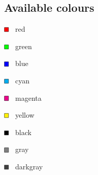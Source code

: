 \documentclass{programmingnotes}
\begin{document}
\begin{multicols*}{2}
\vfill\null

\subsection*{Available colours}
\begin{multicols*}{3}
$\begin{tikzpicture}[scale=0.5, baseline=-0.65ex]
\filldraw[fill=red, draw=black] (-6pt, -6pt) rectangle (6pt, 6pt);
\end{tikzpicture}$ \, red

$\begin{tikzpicture}[scale=0.5, baseline=-0.65ex]
\filldraw[fill=green, draw=black] (-6pt, -6pt) rectangle (6pt, 6pt);
\end{tikzpicture}$ \, green

$\begin{tikzpicture}[scale=0.5, baseline=-0.65ex]
\filldraw[fill=blue, draw=black] (-6pt, -6pt) rectangle (6pt, 6pt);
\end{tikzpicture}$ \, blue

$\begin{tikzpicture}[scale=0.5, baseline=-0.65ex]
\filldraw[fill=cyan, draw=black] (-6pt, -6pt) rectangle (6pt, 6pt);
\end{tikzpicture}$ \, cyan

$\begin{tikzpicture}[scale=0.5, baseline=-0.65ex]
\filldraw[fill=magenta, draw=black] (-6pt, -6pt) rectangle (6pt, 6pt);
\end{tikzpicture}$ \, magenta

$\begin{tikzpicture}[scale=0.5, baseline=-0.65ex]
\filldraw[fill=yellow, draw=black] (-6pt, -6pt) rectangle (6pt, 6pt);
\end{tikzpicture}$ \, yellow

$\begin{tikzpicture}[scale=0.5, baseline=-0.65ex]
\filldraw[fill=black, draw=black] (-6pt, -6pt) rectangle (6pt, 6pt);
\end{tikzpicture}$ \, black

$\begin{tikzpicture}[scale=0.5, baseline=-0.65ex]
\filldraw[fill=gray, draw=black] (-6pt, -6pt) rectangle (6pt, 6pt);
\end{tikzpicture}$ \, gray

$\begin{tikzpicture}[scale=0.5, baseline=-0.65ex]
\filldraw[fill=darkgray, draw=black] (-6pt, -6pt) rectangle (6pt, 6pt);
\end{tikzpicture}$ \, darkgray


\end{multicols*}
\end{multicols*}
\end{document}
